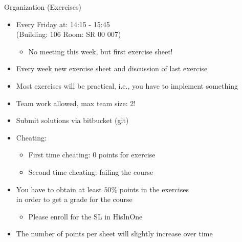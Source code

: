 \begin{frame}[c]{Organization (Exercises)}

\begin{itemize}
  \item Every Friday at: 14:15 - 15:45\\ (Building: 106 Room: SR 00 007)
  \begin{itemize}
    \item No meeting this week, but first exercise sheet!
  \end{itemize}
  \pause
  \item Every week new exercise sheet and discussion of last exercise
  \item Most exercises will be practical, i.e., you have to implement something
  \item Team work allowed, max team size: 2! 
  \item Submit solutions via bitbucket (git)
  \pause
  \item Cheating:
  \begin{itemize}
    \item First time cheating: $0$ points for exercise
    \item Second time cheating: failing the course
  \end{itemize}
  \pause
  \item You have to obtain at least $50\%$ points in the exercises \\
         in order to get a grade for the course
  \begin{itemize}
	  \item Please enroll for the SL in HisInOne
  \end{itemize}
  \pause
  \item The number of points per sheet will slightly increase over time
\end{itemize}

\end{frame}
% 
